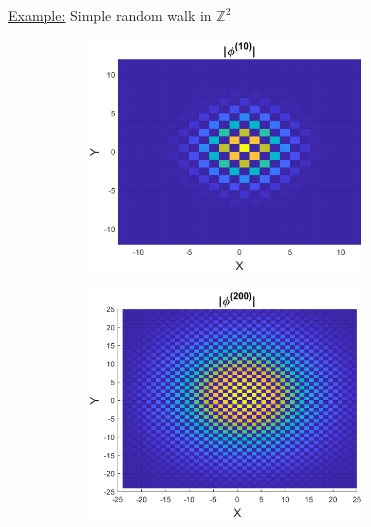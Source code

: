 \documentclass{beamer}
\theoremstyle{definition}
\begin{document}
\begin{frame}
\noindent \underline{Example:} Simple random walk in $\mathbb{Z}^2$

\begin{figure}
	\begin{subfigure}{0.49\textwidth}
		\centering
		\includegraphics[width=0.8\textwidth]{convolve_1.eps}
	\end{subfigure}
	\begin{subfigure}{0.49\textwidth}
		\centering
		\includegraphics[width=0.8\textwidth]{convolve_2.eps}
	\end{subfigure}
\end{figure}
\vspace{-15pt}
\begin{figure}
	\begin{subfigure}{0.49\textwidth}
		\centering

\end{subfigure}
\end{figure}
\end{frame}
\end{document}
